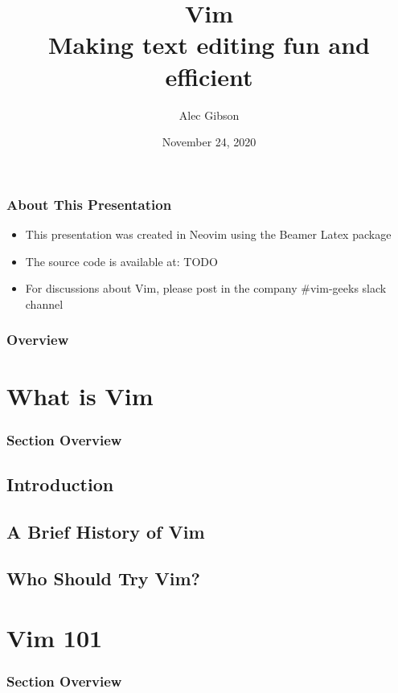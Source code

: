\documentclass{beamer}
\title{\huge Vim \\
		\large Making text editing fun and efficient
}
\author{Alec Gibson}
\institute[BlueCat]
{
		BlueCat Networks \\
		\medskip
		\textit{agibson@bluecatnetworks.com}
}
\date{November 24, 2020}
\begin{document}
\begin{frame}
		\titlepage %
\end{frame}

\begin{frame}
		\frametitle{About This Presentation}
		\begin{itemize}
				\item This presentation was created in Neovim using the Beamer Latex package
				\item The source code is available at: TODO
				\item For discussions about Vim, please post in the company \#vim-geeks slack channel
		\end{itemize}
\end{frame}

\begin{frame}
		\frametitle{Overview}
		\tableofcontents[hideallsubsections]
\end{frame}

\section{What is Vim}
\begin{frame}
		\frametitle{Section Overview}
		\tableofcontents[sections=1]
\end{frame}
\subsection{Introduction}
\begin{frame}
\end{frame}
\subsection{A Brief History of Vim}
\begin{frame}
\end{frame}
\subsection{Who Should Try Vim?}
\begin{frame}
\end{frame}

\section{Vim 101}
\begin{frame}
		\frametitle{Section Overview}
		\tableofcontents[sections=2]
\end{frame}
\end{document}
